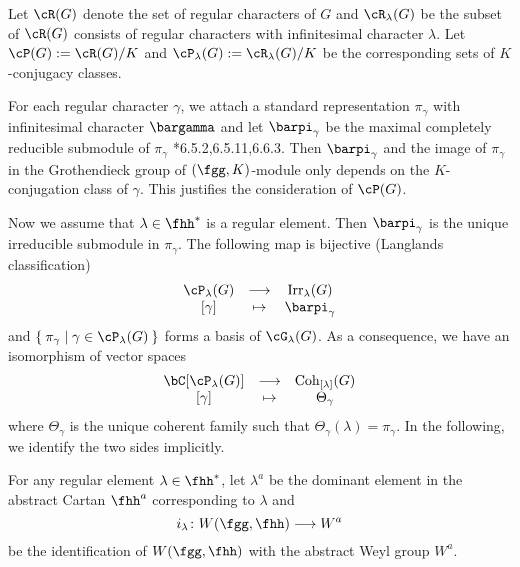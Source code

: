 \documentclass[12pt,a4paper]{amsart}
\numberwithin{equation}{section}
\theoremstyle{remark}
\def\Irr{\mathrm{Irr}}
\def\Coh{\mathrm{Coh}}
\begin{document}
Let $\cR(G)$ denote the set of regular characters of $G$ and $\cR_{\lambda}(G)$ be the subset of $\cR(G)$ consists of regular characters with infinitesimal character $\lambda$. Let $\cP(G):=\cR(G)/K$ and $\cP_{\lambda}(G):=\cR_{\lambda}(G)/K$ be the corresponding sets of $K$-conjugacy classes.

For each regular character $\gamma$, we attach a standard representation
$\pi_\gamma$ with infinitesimal character $\bargamma$ and let $\barpi_\gamma$ be
the maximal completely reducible submodule of $\pi_\gamma$
\cite{Vg}*{6.5.2,6.5.11,6.6.3}. Then $\barpi_\gamma$ and the image of
$\pi_\gamma$ in the Grothendieck group of $(\fgg,K)$-module only depends on the
$K$-conjugation class of $\gamma$. This justifies the consideration of $\cP(G)$.


Now we assume that $\lambda\in \fhh^*$ is a regular element. Then
$\barpi_\gamma$ is the unique irreducible submodule in $\pi_\gamma$.
The following map is bijective (Langlands classification)
\[
  \begin{array}{ccc}
    \cP_{\lambda}(G) & \longrightarrow & \Irr_{\lambda}(G)\\
    {[\gamma]} & \mapsto & \barpi_{\gamma}
  \end{array}
\]
and $\Set{\pi_\gamma|\gamma\in \cP_{\lambda}(G)}$ forms a basis of
$\Grt_{\lambda}(G)$. As a consequence, we have an isomorphism of vector spaces
\[
  \begin{array}{ccc}
    \bC[\cP_{\lambda}(G)] & \longrightarrow & \Coh_{[\lambda]}(G)\\
    {[\gamma]} & \mapsto & \Theta_{\gamma}
  \end{array}
\]
where $\Theta_{\gamma}$ is the unique coherent family such that
$\Theta_{\gamma}(\lambda) = \pi_{\gamma}$.
In the following, we identify the two sides implicitly.

\medskip

\def\Wa{W^{a}}
\def\WiR{W_{i\bR}}
\def\fhhiR{\fhh_{i\bR}}
\def\WR{W_{\bR}}
\def\WC{W_{\bC}}
\def\lama{\lambda^{a}}
\def\Wlama{W^a_{[\lambda]}}
For any
regular element $\lambda\in \fhh^{*}$, let $\lambda^{a}$ be the dominant element
in the abstract Cartan $\fhh^{a}$ corresponding to $\lambda$ and
\[
  i_{\lambda}\colon W(\fgg,\fhh)\longrightarrow \Wa
\]
be the identification of $W(\fgg,\fhh)$ with the abstract Weyl group $\Wa$.
\end{document}
